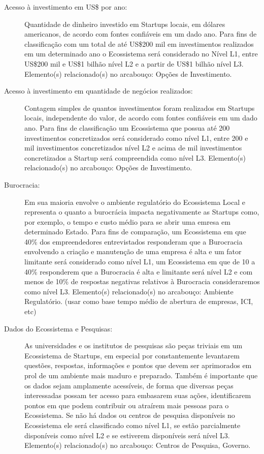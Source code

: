 \begin{description}
  \item [Acesso à investimento em US\$ por ano:] Quantidade de dinheiro investido em Startups locais, em dólares americanos, de acordo com fontes confiáveis em um dado ano. Para fins de classificação com um total de até US\$200 mil em investimentos realizados em um determinado ano o Ecossistema será considerado no Nível L1, entre US\$200 mil e US\$1 bilhão nível L2 e a partir de US\$1 bilhão nível L3. Elemento(s) relacionado(s) no arcabouço: Opções de Investimento. 

  \item [Acesso à investimento em quantidade de negócios realizados:] Contagem simples de quantos investimentos foram realizados em Startups locais, independente do valor, de acordo com fontes confiáveis em um dado ano. Para fins de classificação um Ecossistema que possua até 200 investimentos concretizados será considerado como nível L1, entre 200 e mil investimentos concretizados nível L2 e acima de mil investimentos concretizados a Startup será compreendida como nível L3. Elemento(s) relacionado(s) no arcabouço: Opções de Investimento.

  \item [Burocracia:] Em sua maioria envolve o ambiente regulatório do Ecossistema Local e representa o quanto a burocrácia impacta negativamente as Startups como, por exemplo, o tempo e custo médio para se abrir uma emresa em determinado Estado. Para fins de comparação, um Ecossistema em que 40\% dos empreendedores entrevistados responderam que a Burocracia envolvendo a criação e manutenção de uma empresa é alta e um fator limitante será considerado como nível L1, um Ecossistema em que de 10 a 40\% responderem que a Burocracia é alta e limitante será nível L2 e com menos de 10\% de respostas negativas relativos à Burocracia consideraremos como nível L3. Elemento(s) relacionado(s) no arcabouço: Ambiente Regulatório. (usar como base tempo médio de abertura de empresas, ICI, etc)

  \item [Dados do Ecossistema e Pesquisas:] As universidades e os institutos de pesquisas são peças triviais em um Ecossistema de Startups, em especial por constantemente levantarem questões, respostas, informações e pontos que devem ser aprimorados em prol de um ambiente mais maduro e preparado. Também é importante que os dados sejam amplamente acessíveis, de forma que diversas peças interessadas possam ter acesso para embasarem suas ações, identificarem pontos em que podem contribuir ou atraírem mais pessoas para o Ecossistema. Se não há dados ou centros de pesquisa disponíveis no Ecossistema ele será classificado como nível L1, se estão parcialmente disponíveis como nível L2 e se estiverem disponíveis será nível L3. Elemento(s) relacionado(s) no arcabouço: Centros de Pesquisa, Governo.
  

\end{description}
